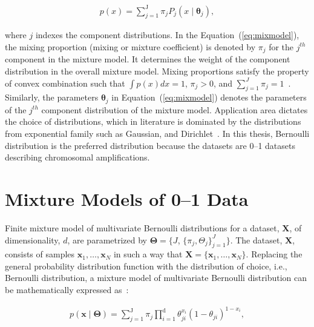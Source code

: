 \begin{eqnarray}
\label{eq:mixmodel}
 p(x)=\displaystyle\sum_{j=1}^{\mathrm{J}} \pi_j P_j(x \mid \boldsymbol{\theta}_j),
\end{eqnarray}

where $j$ indexes the component distributions. In the 
Equation~(\ref{eq:mixmodel}), the mixing proportion 
(mixing or mixture coefficient) is denoted by $\pi_j$ for the $j^{th}$
component in the mixture model. It determines the weight of the 
component distribution in the overall mixture model. 
Mixing proportions satisfy  the property of convex combination such that 
$\int p(x)dx=1$, $\pi_j > 0$, and $\sum_{j=1}^{J}\pi_{j}=1$~\cite{everittmixdist}. 
Similarly, the parameters $\boldsymbol{\theta}_j$ in  
Equation~(\ref{eq:mixmodel}) denotes  the parameters 
of the $j^{th}$ component distribution of the mixture model.
Application area dictates the choice of distributions, which 
in literature is dominated by the distributions from exponential 
family such as Gaussian, and  Dirichlet~\cite{mclachlanfmm}. 
In this thesis, Bernoulli distribution is the preferred distribution 
because the datasets are 0--1 datasets describing chromosomal
amplifications.

\section{Mixture Models of 0--1 Data}
\label{s:mixmdl01}
Finite mixture model of multivariate Bernoulli distributions 
for a data\-set, $\boldsymbol{X}$, of
dimensionality, $d$, are parametrized by 
$\boldsymbol{\Theta}=\{J$, $\{ \pi_j,\Theta _j\}_{j=1}^{J}\}$. 
The data\-set, $\boldsymbol{X}$, consists of samples
$\mathbf{x}_1, \ldots, \mathbf{x}_N $ in such a way that
$\boldsymbol{X} = \{\mathbf{x}_1, \ldots, \mathbf{x}_N \}$.
Replacing the general probability distribution function with 
the distribution of choice, i.e., Bernoulli distribution, 
a mixture model of multivariate Bernoulli distribution can 
be mathematically expressed as~\cite{everittmixdist,wolfe70}:

\begin{eqnarray}
\label{eq:mixmdl01data}
p(\mathbf{x} \mid \boldsymbol{\Theta})= \displaystyle\sum_{j=1}^{\mathrm{J}} \pi_j \displaystyle \prod _{i=1} ^{\mathrm{d}} \theta_{ji}^{x_i} (1-\theta_{ji})^{1-x_i},
\end{eqnarray}

 
